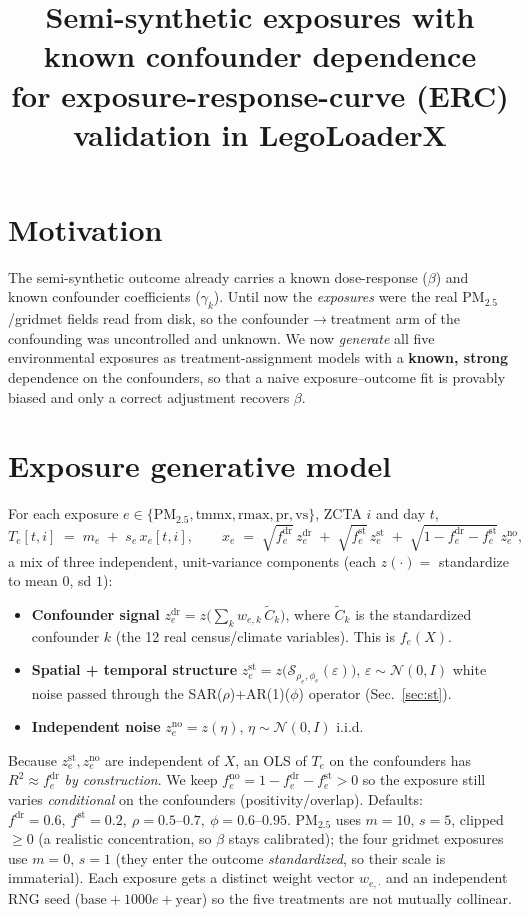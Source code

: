 \documentclass[11pt]{article}
\title{Semi-synthetic exposures with known confounder dependence\\
\large for exposure-response-curve (ERC) validation in LegoLoaderX}
\author{}
\date{}
\begin{document}
\maketitle

\section{Motivation}
The semi-synthetic outcome already carries a known dose-response ($\beta$) and known confounder
coefficients ($\gamma_k$). Until now the \emph{exposures} were the real PM$_{2.5}$/gridmet fields read
from disk, so the confounder$\to$treatment arm of the confounding was uncontrolled and unknown. We now
\emph{generate} all five environmental exposures as treatment-assignment models with a
\textbf{known, strong} dependence on the confounders, so that a naive exposure--outcome fit is
provably biased and only a correct adjustment recovers $\beta$.

\section{Exposure generative model}
For each exposure $e\in\{\text{PM}_{2.5},\text{tmmx},\text{rmax},\text{pr},\text{vs}\}$, ZCTA $i$ and
day $t$,
\[
  T_e[t,i] \;=\; m_e \;+\; s_e\, x_e[t,i], \qquad
  x_e \;=\; \sqrt{f^{\mathrm{dr}}_e}\,z^{\mathrm{dr}}_e
          \;+\; \sqrt{f^{\mathrm{st}}_e}\,z^{\mathrm{st}}_e
          \;+\; \sqrt{1-f^{\mathrm{dr}}_e-f^{\mathrm{st}}_e}\,z^{\mathrm{no}}_e,
\]
a mix of three independent, unit-variance components (each $z(\cdot)=$ standardize to mean $0$, sd $1$):
\begin{itemize}\itemsep2pt
  \item \textbf{Confounder signal} $z^{\mathrm{dr}}_e = z\!\big(\sum_k w_{e,k}\,\tilde C_k\big)$, where
        $\tilde C_k$ is the standardized confounder $k$ (the 12 real census/climate variables). This is
        $f_e(X)$.
  \item \textbf{Spatial + temporal structure} $z^{\mathrm{st}}_e = z\!\big(\mathcal S_{\rho_e,\phi_e}(\varepsilon)\big)$,
        $\varepsilon\sim\mathcal N(0,I)$ white noise passed through the SAR($\rho$)+AR(1)($\phi$) operator
        (Sec.~\ref{sec:st}).
  \item \textbf{Independent noise} $z^{\mathrm{no}}_e = z(\eta)$, $\eta\sim\mathcal N(0,I)$ i.i.d.
\end{itemize}
Because $z^{\mathrm{st}}_e,z^{\mathrm{no}}_e$ are independent of $X$, an OLS of $T_e$ on the confounders
has $R^2\approx f^{\mathrm{dr}}_e$ \emph{by construction}. We keep $f^{\mathrm{no}}_e=1-f^{\mathrm{dr}}_e-f^{\mathrm{st}}_e>0$
so the exposure still varies \emph{conditional} on the confounders (positivity/overlap). Defaults:
$f^{\mathrm{dr}}=0.6,\ f^{\mathrm{st}}=0.2,\ \rho=0.5\text{--}0.7,\ \phi=0.6\text{--}0.95$. PM$_{2.5}$ uses
$m=10,\,s=5$, clipped $\ge 0$ (a realistic concentration, so $\beta$ stays calibrated); the four gridmet
exposures use $m=0,\,s=1$ (they enter the outcome \emph{standardized}, so their scale is immaterial).
Each exposure gets a distinct weight vector $w_{e,\cdot}$ and an independent RNG seed
($\text{base}+1000e+\text{year}$) so the five treatments are not mutually collinear.
\end{document}
